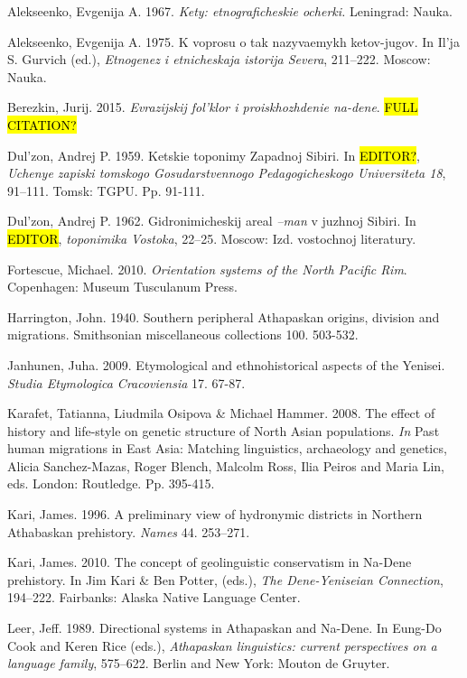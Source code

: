 \begin{hang}

Alekseenko, Evgenija A. 1967. \textit{Kety: etnograficheskie ocherki.} Leningrad: Nauka.

Alekseenko, Evgenija A. 1975. K voprosu o tak nazyvaemykh ketov-jugov. In Il’ja S. Gurvich (ed.), \textit{Etnogenez i etnicheskaja istorija Severa}, 211--222.  Moscow: Nauka.

Berezkin, Jurij. 2015.  \textit{Evrazijskij fol’klor i proiskhozhdenie na-dene}. \hl{FULL CITATION?}

Dul’zon, Andrej P. 1959. Ketskie toponimy Zapadnoj Sibiri.  In \hl{EDITOR?}, \textit{Uchenye zapiski tomskogo Gosudarstvennogo Pedagogicheskogo Universiteta 18}, 91--111. Tomsk: TGPU. Pp. 91{}-111.

Dul’zon, Andrej P. 1962. Gidronimicheskij areal \textit{–man} v juzhnoj Sibiri. In \hl{EDITOR}, \textit{toponimika Vostoka}, 22--25. Moscow: Izd. vostochnoj literatury.

Fortescue, Michael. 2010. \textit{Orientation systems of the North Pacific Rim}. Copenhagen: Museum Tusculanum Press.

Harrington, John. 1940. Southern peripheral Athapaskan origins, division and migrations. Smithsonian miscellaneous collections 100. 503-532.

Janhunen, Juha. 2009. Etymological and ethnohistorical aspects of the Yenisei. \textit{Studia Etymologica Cracoviensia} 17. 67-87.

Karafet, Tatianna, Liudmila Osipova \& Michael Hammer. 2008. The effect of history and life-style on genetic structure of North Asian populations. \textit{In} Past human migrations in East Asia: Matching linguistics, archaeology and genetics, Alicia Sanchez-Mazas, Roger Blench, Malcolm Ross, Ilia Peiros and Maria Lin, eds. London: Routledge. Pp. 395-415.

Kari, James. 1996. A preliminary view of hydronymic districts in Northern Athabaskan prehistory. \textit{Names} 44. 253--271.

Kari, James. 2010. The concept of geolinguistic conservatism in Na-Dene prehistory. In Jim Kari \& Ben Potter, (eds.), \textit{The Dene-Yeniseian Connection}, 194--222.  Fairbanks: Alaska Native Language Center.

Leer, Jeff. 1989. Directional systems in Athapaskan and Na-Dene. In Eung-Do Cook and Keren Rice (eds.), \textit{Athapaskan linguistics: current perspectives on a language family}, 575--622.  Berlin and New York: Mouton de Gruyter.


\end{hang}
